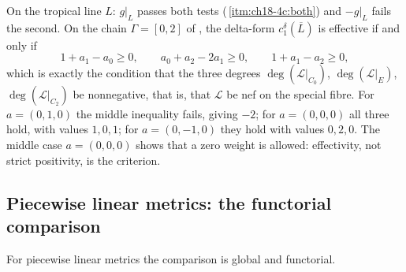 \begin{example}
\label{ex:ch18-frame-criterion-numbers}
On the tropical line $L$: $g|_L$ passes both tests
(\,\cref{itm:ch18-4c:both}) and $-g|_L$
fails the second.  On the chain $\Gamma=[0,2]$ of
, the delta-form
$c_1^\delta(\overline L)$ is effective if and only if
\[
 1+a_1-a_0\geq0,\qquad a_0+a_2-2a_1\geq0,\qquad 1+a_1-a_2\geq0 ,
\]
which is exactly the condition that the three degrees
$\deg(\mathcal L|_{C_0})$, $\deg(\mathcal L|_E)$, $\deg(\mathcal L|_{C_2})$
be nonnegative, that is, that $\mathcal L$ be nef on the special fibre.  For
$a=(0,1,0)$ the middle inequality fails, giving $-2$; for $a=(0,0,0)$ all
three hold, with values $1,0,1$; for $a=(0,-1,0)$ they hold with values
$0,2,0$.  The middle case $a=(0,0,0)$ shows that a zero weight is allowed:
effectivity, not strict positivity, is the criterion.
\end{example}

\subsection{Piecewise linear metrics: the functorial comparison}
\label{sec:ch18-pl-comparison}

For piecewise linear metrics the comparison is global and functorial.

